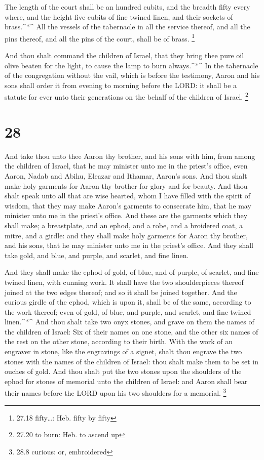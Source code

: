  The length of the court shall be an hundred cubits, and
the breadth fifty every where, and the height five cubits of fine twined
linen, and their sockets of brass.\^{}*\^{}  All the
vessels of the tabernacle in all the service thereof, and all the pins
thereof, and all the pins of the court, shall be of brass. \footnote{27.18
  fifty\ldots: Heb. fifty by fifty}

 And thou shalt command the children of Israel, that they
bring thee pure oil olive beaten for the light, to cause the lamp to
burn always.\^{}*\^{}  In the tabernacle of the
congregation without the vail, which is before the testimony, Aaron and
his sons shall order it from evening to morning before the LORD: it
shall be a statute for ever unto their generations on the behalf of the
children of Israel. \footnote{27.20 to burn: Heb. to ascend up}

\hypertarget{section-27}{%
\section{28}\label{section-27}}

 And take thou unto thee Aaron thy brother, and his sons
with him, from among the children of Israel, that he may minister unto
me in the priest's office, even Aaron, Nadab and Abihu, Eleazar and
Ithamar, Aaron's sons.  And thou shalt make holy garments
for Aaron thy brother for glory and for beauty.  And thou
shalt speak unto all that are wise hearted, whom I have filled with the
spirit of wisdom, that they may make Aaron's garments to consecrate him,
that he may minister unto me in the priest's office.  And
these are the garments which they shall make; a breastplate, and an
ephod, and a robe, and a broidered coat, a mitre, and a girdle: and they
shall make holy garments for Aaron thy brother, and his sons, that he
may minister unto me in the priest's office.  And they shall
take gold, and blue, and purple, and scarlet, and fine linen.

 And they shall make the ephod of gold, of blue, and of
purple, of scarlet, and fine twined linen, with cunning work.
 It shall have the two shoulderpieces thereof joined at the
two edges thereof; and so it shall be joined together.  And
the curious girdle of the ephod, which is upon it, shall be of the same,
according to the work thereof; even of gold, of blue, and purple, and
scarlet, and fine twined linen.\^{}*\^{}  And thou shalt
take two onyx stones, and grave on them the names of the children of
Israel:  Six of their names on one stone, and the other six
names of the rest on the other stone, according to their birth.
 With the work of an engraver in stone, like the engravings
of a signet, shalt thou engrave the two stones with the names of the
children of Israel: thou shalt make them to be set in ouches of gold.
 And thou shalt put the two stones upon the shoulders of
the ephod for stones of memorial unto the children of Israel: and Aaron
shall bear their names before the LORD upon his two shoulders for a
memorial. \footnote{28.8 curious: or, embroidered}

